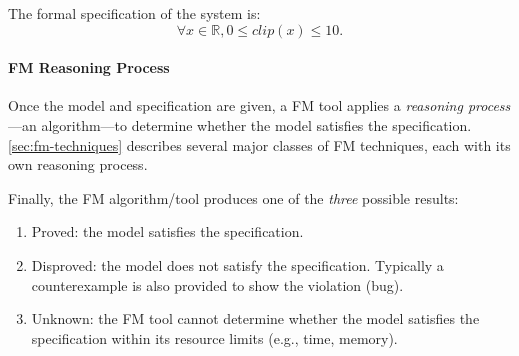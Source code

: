 \documentclass[oneside,11pt,dvipsnames]{book}
\numberwithin{equation}{section}
\theoremstyle{definition}
\theoremstyle{remark}
\begin{document}
The formal specification of the system is: 
\begin{equation}
\forall x \in \mathbb{R}, 0 \leq clip(x) \leq 10.
\end{equation}

\paragraph{FM Reasoning Process}

Once the model and specification are given, a FM tool applies a \emph{reasoning process}---an algorithm---to determine whether the model satisfies the specification. \autoref{sec:fm-techniques} describes several major classes of FM techniques, each with its own reasoning process.






Finally, the FM algorithm/tool produces one of the \emph{three} possible results:
\begin{enumerate}
\item Proved:  the model satisfies the specification. 
\item Disproved: the model does not satisfy the specification. Typically a counterexample is also provided to show the violation (bug).
\item Unknown: the FM tool cannot determine whether the model satisfies the specification within its resource limits (e.g., time, memory).
\end{enumerate}






\end{document}
